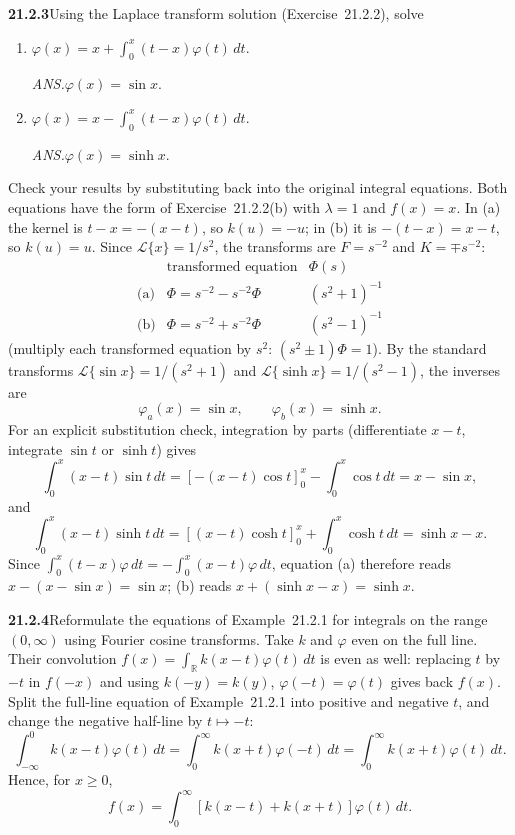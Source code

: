 \par\bigskip
\noindent\textbf{21.2.3}\quad Using the Laplace transform solution
(Exercise~21.2.2), solve
\begin{enumerate}
\item[(a)] $\varphi(x)=x+\displaystyle\int_{0}^{x}
(t-x)\varphi(t)\,dt$.
\par\nobreak\hfill\emph{ANS.}\enspace$\varphi(x)=\sin x$.
\item[(b)] $\varphi(x)=x-\displaystyle\int_{0}^{x}
(t-x)\varphi(t)\,dt$.
\par\nobreak\hfill\emph{ANS.}\enspace$\varphi(x)=\sinh x$.
\end{enumerate}
Check your results by substituting back into the original
integral equations.
\solution
Both equations have the form of Exercise~21.2.2(b) with $\lambda=1$
and $f(x)=x$. In (a) the kernel is $t-x=-(x-t)$, so $k(u)=-u$; in (b)
it is $-(t-x)=x-t$, so $k(u)=u$. Since $\mathcal L\{x\}=1/s^2$, the
transforms are $F=s^{-2}$ and $K=\mp s^{-2}$:
\[
\begin{array}{c|c|c}
&\text{transformed equation}&\Phi(s)\\ \hline
\text{(a)}&\Phi=s^{-2}-s^{-2}\Phi&(s^2+1)^{-1}\\
\text{(b)}&\Phi=s^{-2}+s^{-2}\Phi&(s^2-1)^{-1}
\end{array}
\]
(multiply each transformed equation by $s^2$: $(s^2\pm1)\Phi=1$).
By the standard transforms $\mathcal L\{\sin x\}=1/(s^2+1)$ and
$\mathcal L\{\sinh x\}=1/(s^2-1)$, the inverses are
\[
\boxed{\varphi_a(x)=\sin x,\qquad\varphi_b(x)=\sinh x}.
\]
For an explicit substitution check, integration by parts
(differentiate $x-t$, integrate $\sin t$ or $\sinh t$) gives
\[
\int_0^x(x-t)\sin t\,dt
=\left[-(x-t)\cos t\right]_0^x-\int_0^x\cos t\,dt
=x-\sin x,
\]
and
\[
\int_0^x(x-t)\sinh t\,dt
=\left[(x-t)\cosh t\right]_0^x+\int_0^x\cosh t\,dt
=\sinh x-x.
\]
Since $\int_0^x(t-x)\varphi\,dt=-\int_0^x(x-t)\varphi\,dt$,
equation (a) therefore reads $x-(x-\sin x)=\sin x$;
(b) reads $x+(\sinh x-x)=\sinh x$.


\par\bigskip
\noindent\textbf{21.2.4}\quad Reformulate the equations of
Example~21.2.1 for integrals on the range $(0,\infty)$ using
Fourier cosine transforms.
\solution
Take $k$ and $\varphi$ even on the full line. Their convolution
$f(x)=\int_{\mathbb R}k(x-t)\varphi(t)\,dt$ is even as well: replacing
$t$ by $-t$ in $f(-x)$ and using $k(-y)=k(y)$, $\varphi(-t)=\varphi(t)$
gives back $f(x)$. Split the full-line equation of Example~21.2.1 into
positive and negative $t$, and change the negative half-line by
$t\mapsto-t$:
\[
\int_{-\infty}^0k(x-t)\varphi(t)\,dt
=\int_0^\infty k(x+t)\varphi(-t)\,dt
=\int_0^\infty k(x+t)\varphi(t)\,dt.
\]
Hence, for $x\ge0$,
\[
\boxed{f(x)=\int_0^\infty
[k(x-t)+k(x+t)]\varphi(t)\,dt}.
\]

